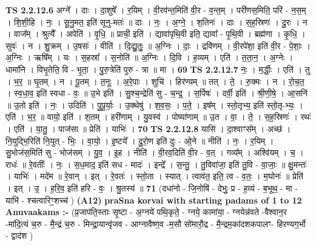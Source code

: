 \documentclass[17pt]{extarticle}
\begin{document}
                  \newline
                                \textbf{ TS 2.2.12.6} \newline
                  अग्ने᳚ । दाः । दा॒शुषे᳚ । र॒यिम् । वी॒रव॑न्त॒मिति॑ वी॒र - व॒न्त॒म् । परी॑णस॒मिति॒ परि॑ - न॒स॒म् । शि॒शी॒हि । नः॒ । सू॒नु॒मत॒ इति॑ सूनु-मतः॑ ॥ दाः । नः॒ । अ॒ग्ने॒ । श॒तिनः॑ । दाः । स॒ह॒स्रिणः॑ । दु॒रः । न । वाज᳚म् । श्रुत्यै᳚ । अपेति॑ । वृ॒धि॒ ॥ प्राची॒ इति॑ । द्यावा॑पृथि॒वी इति॒ द्यावा᳚ - पृ॒थि॒वी । ब्रह्म॑णा । कृ॒धि॒ । सुवः॑ । न । शु॒क्रम् । उ॒षसः॑ । वीति॑ । दि॒द्यु॒तुः॒ ॥ अ॒ग्निः । दाः॒ । द्रवि॑णम् । वी॒रपे॑शा॒ इति॑ वी॒र - पे॒शाः॒ । अ॒ग्निः । ऋषि᳚म् । यः । स॒हस्रा᳚ । स॒नोति॑ ॥ अ॒ग्निः । दि॒वि । ह॒व्यम् । एति॑ । त॒ता॒न॒ । अ॒ग्नेः । धामा॑नि । विभृ॒तेति॒ वि - भृ॒ता॒ । पु॒रु॒त्रेति॑ पुरु - त्रा ॥ मा । \textbf{  69} \newline
                  \newline
                                \textbf{ TS 2.2.12.7} \newline
                  नः॒ । म॒र्द्धीः॒ । एति॑ । तु । भ॒र॒ ॥ घृ॒तम् । न । पू॒तम् । त॒नूः । अ॒रे॒पाः । शुचि॑ । हिर॑ण्यम् ॥ तत् । ते॒ । रु॒क्मः । न । रो॒च॒त॒ । स्व॒धा॒व॒ इति॑ स्वधा - वः॒ ॥ उ॒भे इति॑ । सु॒श्च॒न्द्रेति॑ सु - च॒न्द्र॒ । स॒र्पिषः॑ । दर्वी॒ इति॑ । श्री॒णी॒षे॒ । आ॒सनि॑ ॥ उ॒तो इति॑ । नः॒ । उदिति॑ । पु॒पू॒र्याः॒ । उ॒क्थेषु॑ । श॒व॒सः॒ । प॒ते॒ । इष᳚म् । स्तो॒तृभ्य॒ इति॑ स्तो॒तृ-भ्यः॒ । एति॑ । भ॒र॒ ॥ वायो॒ इति॑ । श॒तम् । हरी॑णाम् । यु॒वस्व॑ । पोष्या॑णाम् ॥ उ॒त । वा॒ । ते॒ । स॒ह॒स्रिणः॑ । रथः॑ । एति॑ । या॒तु॒ । पाज॑सा ॥ प्रेति॑ । याभिः॑ । \textbf{  70} \newline
                  \newline
                                \textbf{ TS 2.2.12.8} \newline
                  यासि॑ । दा॒श्वाꣳस᳚म् । अच्छ॑ । नि॒युद्भि॒रिति॑ नि॒युत् - भिः॒ । वा॒यो॒ । इ॒ष्टये᳚ । दु॒रो॒ण इति॑ दुः - ओ॒ने ॥ नीति॑ । नः॒ । र॒यिम् । सु॒भोज॑स॒मिति॑ सु - भोज॑सम् । यु॒व॒ । इ॒ह । नीति॑ । वी॒रव॒दिति॑ वी॒र - व॒त् । गव्य᳚म् । अश्वि॑यम् । च॒ । राधः॑ ॥ रे॒वतीः᳚ । नः॒ । स॒ध॒माद॒ इति॑ सध - मादः॑ । इन्द्रे᳚ । स॒न्तु॒ । तु॒विवा॑जा॒ इति॑ तु॒वि - वा॒जाः॒ ॥ क्षु॒मन्तः॑ । याभिः॑ । मदे॑म ॥ रे॒वान् । इत् । रे॒वतः॑ । स्तो॒ता । स्यात् । त्वाव॑त॒ इति॒ त्व - व॒तः॒ । म॒घोनः॑ ॥ प्रेति॑ । इत् । उ॒ । ह॒रि॒व॒ इति॑ हरि - वः॒ । श्रु॒तस्य॑ ॥ \textbf{  71} \newline
                  \newline
                      (दधा॑नो - जि॒नोषि॑ - देभुः॒ प्र - ह॒व्यं - ब॒भूथ॒ - मा - याभि॑ - श्चत्वारिꣳ॒॒शच्च॑ )  \textbf{(A12)} \newline \newline
\textbf{praSna korvai with starting padams of 1 to 12 Anuvaakams :-} \newline
(प्र॒जाप॑ति॒स्ताः सृ॒ष्टा - अ॒ग्नये॑ पथि॒कृते॒ - ग्नये॒ कामा॑या॒ - ग्नयेन्न॑वते -वैश्वान॒र -मा॑दि॒त्यं च॒रु - मै॒न्द्रं च॒रु - मिन्द्रा॒यान्वृ॑जव - आग्नावैष्ण॒व -म॒सौ सो॑मारौ॒द्र - मै॒न्द्रम॒का॑दशकपालꣳ- हिरण्यग॒र्भो - द्वाद॑श ) \newline
\end{document}
